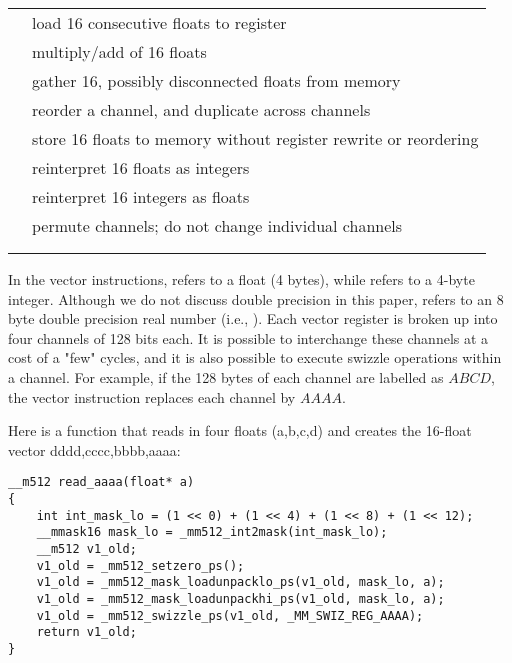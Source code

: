 \def\loadps{\ttt{\_mm512\_load\_ps}}
\def\loadds{\ttt{\_mm512\_load\_ds}}
\def\fmadps{\ttt{\_mm512\_fmad\_ps}}
\def\gatherps{\ttt{\_mm512\_i32gather\_ps}}
\def\swizzleps{\ttt{\_mm512\_swizzle\_ps}}
\def\storenrngops{\ttt{\_mm512\_storenrngo\_ps}}
\def\castsi{\ttt{\_mm512\_castsi512\_ps}}
\def\permute{\ttt{\_mm512\_permute4f128\_epi32}}
\def\intmask{\ttt{\_mm512\_int2mask}}
\def\loadunpack{\ttt{\_mm512\_mask\_loadunpacklo\_epi32}}
\def\castitops{\ttt{\_mm512\_castsi512\_ps}}
\def\castpstoi{\ttt{\_mm512\_castps\_si512\_ps}}
%
\begin{center}
\begin{tabular}{|l|l|}
\hline
\loadps &  load 16 consecutive floats to register\\
\fmadps &  multiply/add of 16 floats\\
\gatherps &  gather 16, possibly disconnected floats from memory\\
\swizzleps &  reorder a channel, and duplicate across channels\\
\storenrngops &  store 16 floats to memory without register rewrite or reordering\\
\castpstoi & reinterpret 16 floats as integers\\
\castitops & reinterpret 16 integers as floats\\
\permute &  permute channels; do not change individual channels\\
\intmask &  \\
\loadunpack &  \\
\hline
\end{tabular}
\end{center}
%
In the vector instructions,  refers to a float (4 bytes), while  refers to a 4-byte integer. Although we do not discuss double precision in this paper,  refers to an 8 byte double precision real number (i.e., \loadds). 
Each vector register is broken up into four channels of 128 bits each. It is possible to interchange these channels at a cost of a "few"  cycles, and it is also possible to execute swizzle operations within a channel. For example, if the 128 bytes of each channel are labelled as $ABCD$, the vector instruction 
replaces each channel by $AAAA$. 

Here is a function that reads in four floats (a,b,c,d) and creates the 16-float vector dddd,cccc,bbbb,aaaa: 
\begin{verbatim}
__m512 read_aaaa(float* a)                                                              
{
    int int_mask_lo = (1 << 0) + (1 << 4) + (1 << 8) + (1 << 12);
    __mmask16 mask_lo = _mm512_int2mask(int_mask_lo);
    __m512 v1_old;
    v1_old = _mm512_setzero_ps();
    v1_old = _mm512_mask_loadunpacklo_ps(v1_old, mask_lo, a);
    v1_old = _mm512_mask_loadunpackhi_ps(v1_old, mask_lo, a);
    v1_old = _mm512_swizzle_ps(v1_old, _MM_SWIZ_REG_AAAA);
    return v1_old;
}
\end{verbatim}

